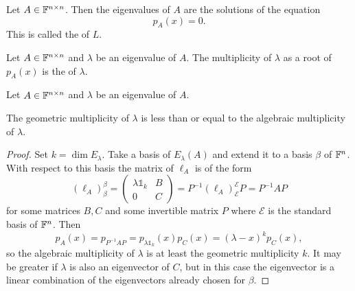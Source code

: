 \begin{proposition}
Let $A\in\mathbb{F}^{n\times n}$. Then the eigenvalues of $A$ are the solutions of the equation
\[ p_A(x) = 0. \]
This is called the  of $L$.
\end{proposition}

\begin{definition}
Let $A\in\mathbb{F}^{n\times n}$ and $\lambda$ be an eigenvalue of $A$. The multiplicity of $\lambda$ as a root of $p_A(x)$ is the  of $\lambda$.
\end{definition}
\begin{lemma}
Let $A\in\mathbb{F}^{n\times n}$ and $\lambda$ be an eigenvalue of $A$.

The geometric multiplicity of $\lambda$ is less than or equal to the algebraic multiplicity of $\lambda$.
\end{lemma}
\begin{proof}
Set $k=\dim E_\lambda$. Take a basis of $E_\lambda(A)$ and extend it to a basis $\beta$ of $\mathbb{F}^{n}$. With respect to this basis the matrix of $\ell_A$ is of the form
\[ (\ell_A)_\beta^\beta =  \begin{pmatrix}
\lambda \mathbb{1}_k & B \\ 0 & C
\end{pmatrix} = P^{-1}(\ell_A)_\mathcal{E}^\mathcal{E}P = P^{-1}AP \]
for some matrices $B,C$ and some invertible matrix $P$ where $\mathcal{E}$ is the standard basis of $\mathbb{F}^n$. Then 
\[ p_A(x)= p_{P^{-1}AP} = p_{\lambda \mathbb{1}_{k}}(x)p_C(x) = (\lambda - x)^kp_C(x), \]
so the algebraic multiplicity of $\lambda$ is at least the geometric multiplicity $k$. It may be greater if $\lambda$ is also an eigenvector of $C$, but in this case the eigenvector is a linear combination of the eigenvectors already chosen for $\beta$.
\end{proof}

